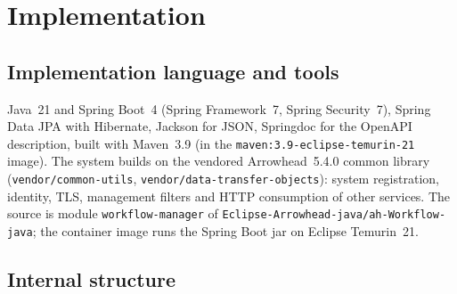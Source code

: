 \documentclass[a4paper]{arrowhead}
\begin{document}
\newpage
\section{Implementation}
\label{sec:implementation}

\subsection{Implementation language and tools}
Java~21 and Spring Boot~4 (Spring Framework~7, Spring Security~7), Spring Data JPA with Hibernate, Jackson for JSON,
Springdoc for the OpenAPI description, built with Maven~3.9 (in the \texttt{maven:3.9-eclipse-temurin-21} image). The
system builds on the vendored Arrowhead~5.4.0 common library (\texttt{vendor/common-utils},
\texttt{vendor/data-transfer-objects}): system registration, identity, TLS, management filters and HTTP consumption
of other services. The source is module \texttt{workflow-manager} of \texttt{Eclipse-Arrowhead-java/ah-Workflow-java}; the
container image runs the Spring Boot jar on Eclipse Temurin~21.

\subsection{Internal structure}
\end{document}
